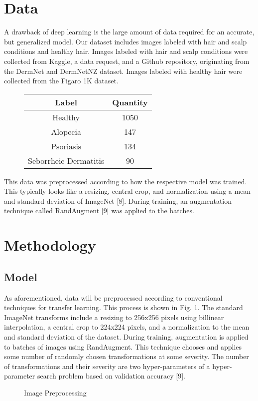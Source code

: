 \documentclass[10pt,twocolumn,letterpaper]{article}
\begin{document}
\section{Data}
A drawback of deep learning is the large amount of data required for an accurate, but generalized model. Our dataset includes images labeled with hair and scalp conditions and healthy hair. Images labeled with hair and scalp conditions were collected from Kaggle, a data request, and a Github repository, originating from the DermNet and DermNetNZ dataset. Images labeled with healthy hair were collected from the Figaro 1K dataset.

\begin{figure}[H]
\centering
\begin{tabular}{ |c|c| }
\hline
 Label & Quantity \\
\hline
 Healthy & 1050 \\
 Alopecia & 147 \\
 Psoriasis & 134 \\
 Seborrheic Dermatitis & 90 \\
\hline
\end{tabular}
\end{figure}
This data was preprocessed according to how the respective model was trained. This typically looks like a resizing, central crop, and normalization using a mean and standard deviation of ImageNet [8]. During training, an augmentation technique called RandAugment [9] was applied to the batches.
\section{Methodology}
\subsection{Model}
As aforementioned, data will be preprocessed according to conventional techniques for transfer learning. This process is shown in Fig. 1. The standard ImageNet transforms include a resizing to 256x256 pixels using billinear interpolation, a central crop to 224x224 pixels, and a normalization to the mean and standard deviation of the dataset. During training, augmentation is applied to batches of images using RandAugment. This technique chooses and applies some number of randomly chosen transformations at some severity. The number of transformations and their severity are two hyper-parameters of a hyper-parameter search problem based on validation accuracy [9].
\begin{figure}[htp]
  \hspace*{\fill}%
  \hfill%
  \hfill%
  \hspace*{\fill}%
\caption{Image Preprocessing}
\end{figure}
\end{document}
